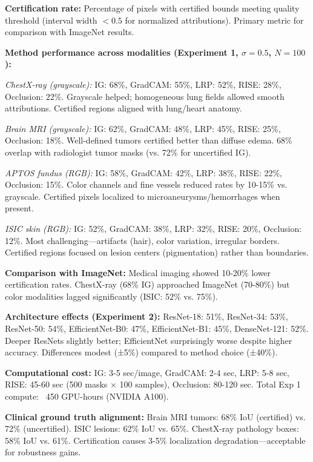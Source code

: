 \documentclass[11pt]{article}
\begin{document}
\textbf{Certification rate:} Percentage of pixels with certified bounds meeting quality threshold (interval width $< 0.5$ for normalized attributions). Primary metric for comparison with ImageNet results.

\textbf{Method performance across modalities (Experiment 1, $\sigma=0.5$, $N=100$):}

\textit{ChestX-ray (grayscale):} IG: 68\%, GradCAM: 55\%, LRP: 52\%, RISE: 28\%, Occlusion: 22\%. Grayscale helped; homogeneous lung fields allowed smooth attributions. Certified regions aligned with lung/heart anatomy.

\textit{Brain MRI (grayscale):} IG: 62\%, GradCAM: 48\%, LRP: 45\%, RISE: 25\%, Occlusion: 18\%. Well-defined tumors certified better than diffuse edema. 68\% overlap with radiologist tumor masks (vs. 72\% for uncertified IG).

\textit{APTOS fundus (RGB):} IG: 58\%, GradCAM: 42\%, LRP: 38\%, RISE: 22\%, Occlusion: 15\%. Color channels and fine vessels reduced rates by 10-15\% vs. grayscale. Certified pixels localized to microaneurysms/hemorrhages when present.

\textit{ISIC skin (RGB):} IG: 52\%, GradCAM: 38\%, LRP: 32\%, RISE: 20\%, Occlusion: 12\%. Most challenging—artifacts (hair), color variation, irregular borders. Certified regions focused on lesion centers (pigmentation) rather than boundaries.

\textbf{Comparison with ImageNet:} Medical imaging showed 10-20\% lower certification rates. ChestX-ray (68\% IG) approached ImageNet (70-80\%) but color modalities lagged significantly (ISIC: 52\% vs. 75\%).

\textbf{Architecture effects (Experiment 2):} ResNet-18: 51\%, ResNet-34: 53\%, ResNet-50: 54\%, EfficientNet-B0: 47\%, EfficientNet-B1: 45\%, DenseNet-121: 52\%. Deeper ResNets slightly better; EfficientNet surprisingly worse despite higher accuracy. Differences modest (±5\%) compared to method choice (±40\%).

\textbf{Computational cost:} IG: 3-5 sec/image, GradCAM: 2-4 sec, LRP: 5-8 sec, RISE: 45-60 sec (500 masks × 100 samples), Occlusion: 80-120 sec. Total Exp 1 compute: ~450 GPU-hours (NVIDIA A100).

\textbf{Clinical ground truth alignment:} Brain MRI tumors: 68\% IoU (certified) vs. 72\% (uncertified). ISIC lesions: 62\% IoU vs. 65\%. ChestX-ray pathology boxes: 58\% IoU vs. 61\%. Certification causes 3-5\% localization degradation—acceptable for robustness gains.
\end{document}
